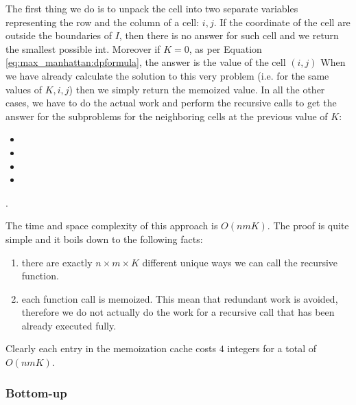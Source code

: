 The first thing we do is to unpack the cell into two separate variables representing the row and the column of a cell: $i,j$.
If the coordinate of the cell are outside the boundaries of $I$, then there is no answer for such cell and we return the smallest possible int.
Moreover if $K=0$, as per Equation \ref{eq:max_manhattan:dpformula}, the answer is the value of the cell $(i,j)$
When we have already calculate the solution to this very problem (i.e. for the same values of $K,i,j$) then we simply return the memoized value.
In all the other cases, we have to do the actual work and perform the recursive calls to get the answer for the subproblems for the neighboring cells at the previous value of $K$:
\begin{itemize}
	\item {}
	\item {}
	\item {}
	\item {}
\end{itemize}.

The time and space complexity of this approach is $O(nmK)$. The proof is quite simple and it boils down to the following facts:
\begin{enumerate}
	\item there are exactly $n\times m \times K$ different unique ways we can call the recursive function.
	\item each function call is memoized. This mean that redundant work is avoided, therefore we do not actually do the work for a recursive call that has been already executed fully.
\end{enumerate}
Clearly each entry in the memoization cache costs $4$ integers for a total of $O(nmK)$.





\subsubsection{Bottom-up}



